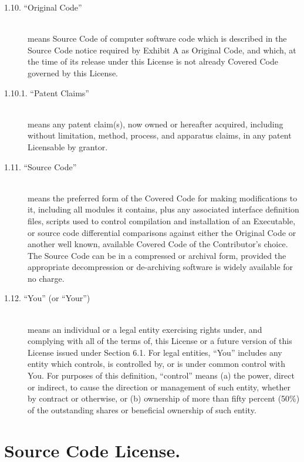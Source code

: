 \documentclass[letterpaper,colorlinks=true,linkcolor=blue]{book}
\begin{document}
\begin{description}
\item [1.10. ``Original Code'']\mbox{}\\
means Source Code of computer software code which is described in the Source Code notice required by Exhibit A as Original Code, and which, at the time of its release under this License is not already Covered Code governed by this License. 

\item [1.10.1. ``Patent Claims'']\mbox{}\\
means any patent claim(s), now owned or hereafter acquired, including without limitation, method, process, and apparatus claims, in any patent Licensable by grantor. 
\item [1.11. ``Source Code'']\mbox{}\\
means the preferred form of the Covered Code for making modifications to it, including all modules it contains, plus any associated interface definition files, scripts used to control compilation and installation of an Executable, or source code differential comparisons against either the Original Code or another well known, available Covered Code of the Contributor's choice. The Source Code can be in a compressed or archival form, provided the appropriate decompression or de-archiving software is widely available for no charge. 
\item [1.12. ``You'' (or ``Your'')]\mbox{}\\
means an individual or a legal entity exercising rights under, and complying with all of the terms of, this License or a future version of this License issued under Section 6.1. For legal entities, ``You'' includes any entity which controls, is controlled by, or is under common control with You. For purposes of this definition, ``control'' means (a) the power, direct or indirect, to cause the direction or management of such entity, whether by contract or otherwise, or (b) ownership of more than fifty percent (50\%) of the outstanding shares or beneficial ownership of such entity. 
\end{description}

\section{Source Code License.}
\end{document}
